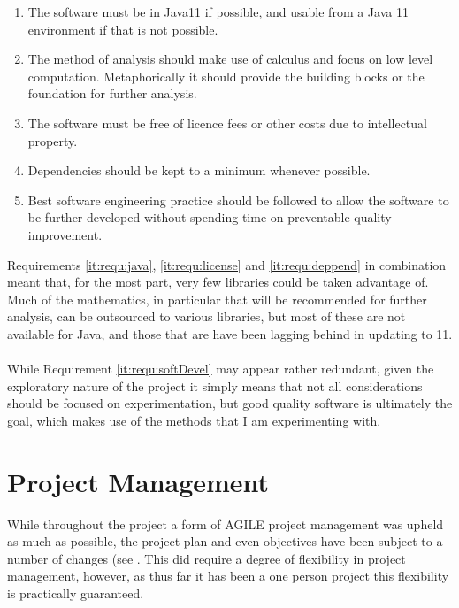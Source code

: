 \documentclass[main.tex]{subfiles}
\begin{document}
    \begin{enumerate}
      \item \label{it:requ:java} The software must be in Java11 if possible, and usable from a Java 11 environment if that is not possible.
      \item \label{it:requ:calculus} The method of analysis should make use of calculus and focus on low level computation. Metaphorically it should provide the building blocks or the foundation for further analysis.
      \item \label{it:requ:license} The software must be free of licence fees or other costs due to intellectual property.
      \item \label{it:requ:deppend} Dependencies should be kept to a minimum whenever possible.
      \item \label{it:requ:softDevel} Best software engineering practice should be followed to allow the software to be further developed without spending time on preventable quality improvement.        
    \end{enumerate}
    
    Requirements \ref{it:requ:java}, \ref{it:requ:license} and \ref{it:requ:deppend} in combination meant that, for the most part, very few  libraries could be taken advantage of. Much of the mathematics, in particular that will be recommended for further analysis, can be outsourced to various libraries, but most of these are not available for Java, and those that are have been lagging behind in updating to 11. 
    \\\\
    While Requirement \ref{it:requ:softDevel} may appear rather redundant, given the exploratory nature of the project it simply means that not all considerations should be focused on experimentation, but good quality software is ultimately the goal, which makes use of the methods that I am experimenting with.
    
  \section{Project Management}
  
    While throughout the project a form of AGILE project management was upheld as much as possible, the project plan and even objectives have been subject to a number of changes (see . This did require a degree of flexibility in project management, however, as thus far it has been a one person project this flexibility is practically guaranteed.
    
\end{document}

